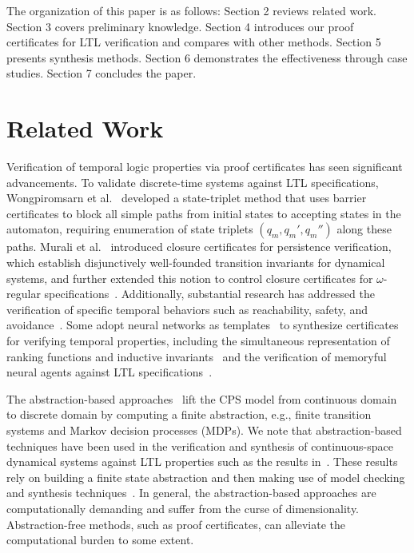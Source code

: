 The organization of this paper is as follows: Section 2 reviews related work. Section 3 covers preliminary knowledge. Section 4 introduces our proof certificates for LTL verification and compares with other methods. Section 5 presents synthesis methods. Section 6 demonstrates the effectiveness through case studies. Section 7 concludes the paper.


\section{Related Work}\label{sec:related}
Verification of temporal logic properties via proof certificates has seen significant advancements. To validate discrete-time systems against LTL specifications, Wongpiromsarn et al.~\cite{wongpiromsarn2015automata} developed a state-triplet method that uses barrier certificates to block all simple paths from initial states to accepting states in the automaton, requiring enumeration of state triplets $(q_m, q_m', q_m'')$ along these paths. Murali et al.~\cite{murali2024closure} introduced closure certificates for persistence verification, which establish disjunctively well-founded transition invariants \cite{podelski2004transition} for dynamical systems, and further extended this notion to control closure certificates for $\omega$-regular specifications~\cite{murali2025control}. Additionally, substantial research has addressed the verification of specific temporal behaviors such as reachability, safety, and avoidance~\cite{chakarov2013probabilistic,chatterjee2016algorithmic,chatterjee2024sound,chatterjee2024equivalence}. Some adopt neural networks as templates~\cite{wang2025verifying, nadali2024neural, zhao2020synthesizing} to synthesize certificates for verifying temporal properties, including the simultaneous representation of ranking functions and inductive invariants~\cite{giacobbe2025let} and the verification of memoryful neural agents against LTL specifications~\cite{hosseini2025ltl}.


The abstraction-based approaches~\cite{vasile2016control, leahy2019control, kress2009temporal, coogan2015traffic, fainekos2009temporal, ding2014optimal, wongpiromsarn2009receding} lift the CPS model from continuous domain to discrete domain by computing a finite abstraction, e.g., finite transition systems and Markov decision processes (MDPs). We note that abstraction-based techniques have been used in the verification and synthesis of continuous-space dynamical systems against LTL properties such as the results in~\cite{henzinger1997hytech, khaled2021omegathreads, lahijanian2011temporal, rungger2016scots}. These results rely on building a finite state abstraction and then making use of model checking and synthesis techniques~\cite{baier2008principles, tabuada2009verification}. In general, the abstraction-based approaches are computationally demanding and suffer from the curse of dimensionality. Abstraction-free methods, such as proof certificates, can alleviate the computational burden to some extent.


